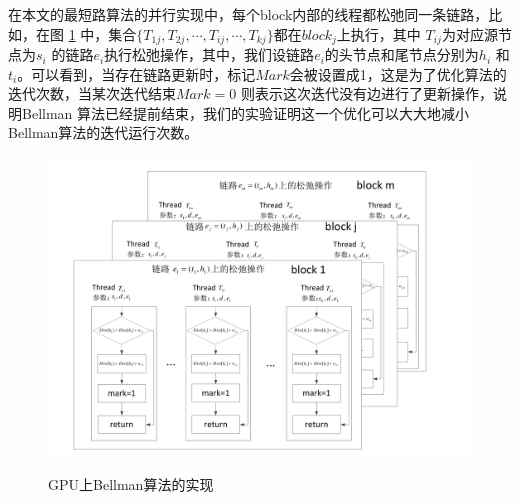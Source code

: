 在本文的最短路算法的并行实现中，每个block内部的线程都松弛同一条链路，比如，在图 \ref{GB} 中，集合$\{T_{1j}, T_{2j}, \cdots, T_{ij}, \cdots, T_{kj}\}$都在$block_j$上执行，其中 $T_{ij}$为对应源节点为$s_i$ 的链路$e_i$执行松弛操作，其中，我们设链路$e_i$的头节点和尾节点分别为$h_i$ 和$t_i$。可以看到，当存在链路更新时，标记$Mark$会被设置成1，这是为了优化算法的迭代次数，当某次迭代结束$Mark=0$ 则表示这次迭代没有边进行了更新操作，说明Bellman 算法已经提前结束，我们的实验证明这一个优化可以大大地减小Bellman算法的迭代运行次数。
\begin{figure}
\setlength{\abovecaptionskip}{-0.5cm}
\begin{center}
{\includegraphics[width=1 \textwidth]{figures/GPUimpl.pdf}}
\end{center}
\caption{{\footnotesize{GPU上Bellman算法的实现}}}
\label{GB}
\end{figure}

